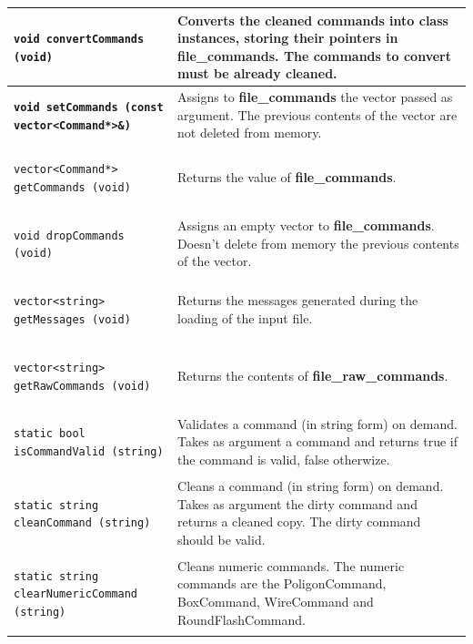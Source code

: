 \documentclass[11pt,twoside,openany,x11names,svgnames]{memoir}
\begin{document}
{\begin{longtable}{| >{\bfseries}p{9.8cm} | p{5.7cm} |}
	\hline
	
	\texttt{void convertCommands (void)} & Converts the cleaned commands into class instances, storing their pointers in \textbf{file\_commands}. The commands to convert must be already cleaned. \\
			
	\hline
	
	\texttt{void setCommands (const vector<Command*>\&)} & Assigns to \textbf{file\_commands} the vector passed as argument. The previous contents of the vector are not deleted from memory. \\
	
	\hline
	
	\texttt{vector<Command*> getCommands (void)} & Returns the value of \textbf{file\_commands}. \\
	
	\hline
	
	\texttt{void dropCommands (void)} & Assigns an empty vector to \textbf{file\_commands}. Doesn't delete from memory the previous contents of the vector. \\
	
	\hline
	
	\texttt{vector<string> getMessages (void)} & Returns the messages generated during the loading of the input file. \\
	
	\hline
	
	\texttt{vector<string> getRawCommands (void)} & Returns the contents of \textbf{file\_raw\_commands}. \\
	
	\hline
	
	\texttt{static bool isCommandValid (string)} & Validates a command (in string form) on demand. Takes as argument a command and returns true if the command is valid, false otherwize. \\
	
	\hline
	
	\texttt{static string cleanCommand (string)} & Cleans a command (in string form) on demand. Takes as argument the dirty command and returns a cleaned copy. The dirty command should be valid. \\
			
	\hline
	
	\texttt{static string clearNumericCommand (string)} & Cleans numeric commands. The numeric commands are the PoligonCommand, BoxCommand, WireCommand and RoundFlashCommand. \\
			

\end{longtable}}
\end{document}
